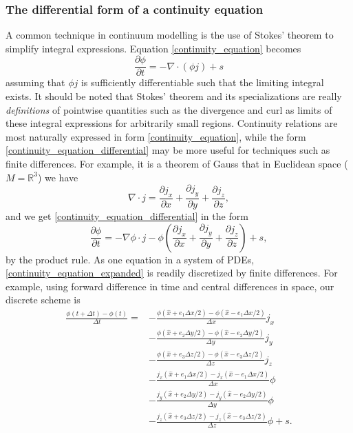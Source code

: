 \documentclass[11pt,a4paper]{memoir}
\newcommand{\Part}[2]{\frac{\partial #1}{\partial #2}}
\begin{document}
\subsubsection{The differential form of a continuity equation}
A common technique in continuum modelling is the use of Stokes' theorem to simplify integral expressions.
Equation \eqref{continuity_equation} becomes
\begin{equation}\label{continuity_equation_differential}
    \Part{\phi}{t} = -\nabla\cdot (\phi j) + s
\end{equation}
assuming that $\phi j$ is sufficiently differentiable such that the limiting integral exists.
It should be noted that Stokes' theorem and its specializations are really \textit{definitions} of pointwise quantities
such as the divergence and curl as limits of these integral expressions for arbitrarily small regions.
Continuity relations are most naturally expressed in form \eqref{continuity_equation}, while the form
\eqref{continuity_equation_differential} may be more useful for techniques such as finite differences.
For example, it is a theorem of Gauss that in Euclidean space ($M = \mathbb{R}^3$) we have
\begin{equation}\label{gauss_euclidean_divergence}
    \nabla \cdot j = \Part{j_x}{x} + \Part{j_y}{y} + \Part{j_z}{z},
\end{equation}
and we get \eqref{continuity_equation_differential} in the form
\begin{equation}\label{continuity_equation_expanded}
    \Part{\phi}{t} = -\nabla \phi \cdot j - \phi\left(\Part{j_x}{x} + \Part{j_y}{y} + \Part{j_z}{z}\right) + s,
\end{equation}
by the product rule.
As one equation in a system of PDEs, \eqref{continuity_equation_expanded} is readily discretized by finite differences. For example, using forward difference in time and
central differences in space, our discrete scheme is
\begin{equation}\label{continuity_equation_finite_differences}
\begin{split}
    \frac{\phi(t + \Delta t) - \phi(t)}{\Delta t} = &-\frac{\phi(\hat{x} + e_1\Delta x/2) - \phi(\hat{x} - e_1\Delta x/2)}{\Delta x}j_x \\
                                                    &-\frac{\phi(\hat{x} + e_2\Delta y/2) - \phi(\hat{x} - e_2\Delta y/2)}{\Delta y}j_y \\
                                                    &-\frac{\phi(\hat{x} + e_3\Delta z/2) - \phi(\hat{x} - e_3\Delta z/2)}{\Delta z}j_z \\
                                                    &-\frac{j_x(\hat{x} + e_1\Delta x/2) - j_x(\hat{x} - e_1\Delta x/2)}{\Delta x}\phi \\
                                                    &-\frac{j_y(\hat{x} + e_2\Delta y/2) - j_y(\hat{x} - e_2\Delta y/2)}{\Delta y}\phi \\
                                                    &-\frac{j_z(\hat{x} + e_3\Delta z/2) - j_z(\hat{x} - e_3\Delta z/2)}{\Delta z}\phi +s.
\end{split}
\end{equation}
\end{document}
